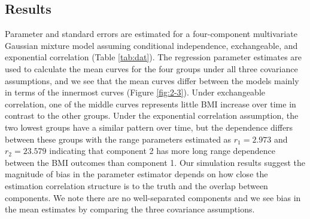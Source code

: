 \subsection{Results}
Parameter and standard errors are estimated for a four-component multivariate Gaussian mixture model assuming conditional independence, exchangeable, and exponential correlation (Table \ref{tab:dat}). The regression parameter estimates are used to calculate the mean curves for the four groups under all three covariance assumptions, and we see that the mean curves differ between the models mainly in terms of the innermost curves (Figure \ref{fig:2-3}).  Under exchangeable correlation, one of the middle curves represents little BMI increase over time in contrast to the other groups. Under the exponential correlation assumption, the two lowest groups have a similar pattern over time, but the dependence differs between these groups with the range parameters estimated as $r_1=2.973$ and $r_2=23.579$ indicating that component 2 has more long range dependence between the BMI outcomes than component 1. Our simulation results suggest the magnitude of bias in the parameter estimator depends on how close the estimation correlation structure is to the truth and the overlap between components. We note there are no well-separated components and we see bias in the mean estimates by comparing the three covariance assumptions. 
